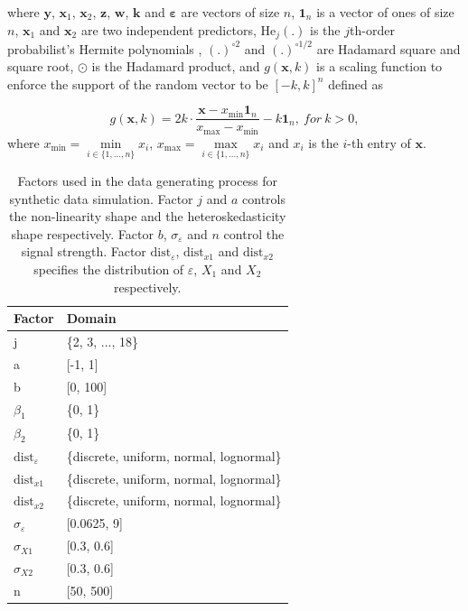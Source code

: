 \documentclass[]{interact}
\theoremstyle{plain}%
\theoremstyle{definition}
\theoremstyle{remark}
\begin{document}
\noindent where \(\boldsymbol{y}\), \(\boldsymbol{x}_1\),
\(\boldsymbol{x}_2\), \(\boldsymbol{z}\), \(\boldsymbol{w}\),
\(\boldsymbol{k}\) and \(\boldsymbol{\varepsilon}\) are vectors of size
\(n\), \(\boldsymbol{1}_n\) is a vector of ones of size \(n\),
\(\boldsymbol{x}_1\) and \(\boldsymbol{x}_2\) are two independent
predictors, \(\text{He}_j(.)\) is the \(j\)th-order probabilist's
Hermite polynomials \citep{hermite1864nouveau}, \((.)^{\circ2}\) and
\((.)^{\circ1/2}\) are Hadamard square and square root, \(\odot\) is the
Hadamard product, and \(g(\boldsymbol{x}, k)\) is a scaling function to
enforce the support of the random vector to be \([-k, k]^n\) defined as

\[g(\boldsymbol{x}, k) = 2k \cdot \frac{\boldsymbol{x} - x_{\min}\boldsymbol{1}_n}{x_{\max} - x_{\min}} - k\boldsymbol{1}_n,~for~k > 0,\]
\noindent where \(x_{\min} = \underset{i \in \{ 1,...,n\}}{\min} x_i\),
\(x_{\max} = \underset{i \in \{ 1,...,n\}}{\max} x_i\) and \(x_i\) is
the \(i\)-th entry of \(\boldsymbol{x}\).

\begin{table}

\caption{\label{tab:factor}Factors used in the data generating process for synthetic data simulation. Factor $j$ and $a$ controls the non-linearity shape and the heteroskedasticity shape respectively. Factor $b$, $\sigma_\varepsilon$ and $n$ control the signal strength. Factor $\text{dist}_\varepsilon$, $\text{dist}_{x1}$ and $\text{dist}_{x2}$ specifies the distribution of $\varepsilon$, $X_1$ and $X_2$ respectively.}
\centering
\begin{tabular}[t]{ll}
\toprule
Factor & Domain\\
\midrule
j & \{2, 3, ..., 18\}\\
a & {}[-1, 1]\\
b & {}[0, 100]\\
$\beta_1$ & \{0, 1\}\\
$\beta_2$ & \{0, 1\}\\
\addlinespace
$\text{dist}_\varepsilon$ & \{discrete, uniform, normal, lognormal\}\\
$\text{dist}_{x1}$ & \{discrete, uniform, normal, lognormal\}\\
$\text{dist}_{x2}$ & \{discrete, uniform, normal, lognormal\}\\
$\sigma_{\varepsilon}$ & {}[0.0625, 9]\\
$\sigma_{X1}$ & {}[0.3, 0.6]\\
\addlinespace
$\sigma_{X2}$ & {}[0.3, 0.6]\\
n & {}[50, 500]\\
\bottomrule
\end{tabular}
\end{table}
\end{document}
